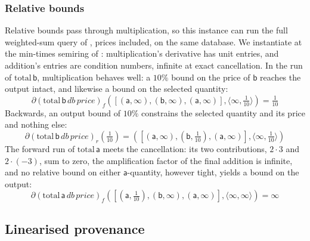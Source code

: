 \subsubsection{Relative bounds}
\label{sec:examples:relative-bounds}

Relative bounds pass through multiplication, so this instance can run the full weighted-sum query
of , prices included, on the same database. We instantiate at
the min-times semiring of : multiplication's derivative has
unit entries, and addition's entries are condition numbers, infinite at exact cancellation. In the run of
$\mathrm{total}\,\mathsf{b}$, multiplication behaves well: a $10\%$ bound on the price of $\mathsf{b}$
reaches the output intact, and likewise a bound on the selected quantity:
\begin{displaymath}
  \partial(\mathrm{total}\,\mathsf{b}\,\mathit{db}\,\mathit{price})_f([(\mathsf{a}, \infty), (\mathsf{b}, \infty), (\mathsf{a}, \infty)], \langle \infty, \tfrac{1}{10} \rangle) = \tfrac{1}{10}
\end{displaymath}
\noindent Backwards, an output bound of $10\%$ constrains the selected quantity and its price and
nothing else:
\begin{displaymath}
  \partial(\mathrm{total}\,\mathsf{b}\,\mathit{db}\,\mathit{price})_r(\tfrac{1}{10}) =
  ([(\mathsf{a}, \infty), (\mathsf{b}, \tfrac{1}{10}), (\mathsf{a}, \infty)], \langle \infty, \tfrac{1}{10} \rangle)
\end{displaymath}
\noindent The forward run of $\mathrm{total}\,\mathsf{a}$ meets the cancellation: its two contributions,
$2 \cdot 3$ and $2 \cdot (-3)$, sum to zero, the amplification factor of the final addition is infinite, and
no relative bound on either $\mathsf{a}$-quantity, however tight, yields a bound on the output:
\begin{displaymath}
  \partial(\mathrm{total}\,\mathsf{a}\,\mathit{db}\,\mathit{price})_f([(\mathsf{a}, \tfrac{1}{10}), (\mathsf{b}, \infty), (\mathsf{a}, \infty)], \langle \infty, \infty \rangle) = \infty
\end{displaymath}

\subsection{Linearised provenance}
\label{sec:examples:counting}

